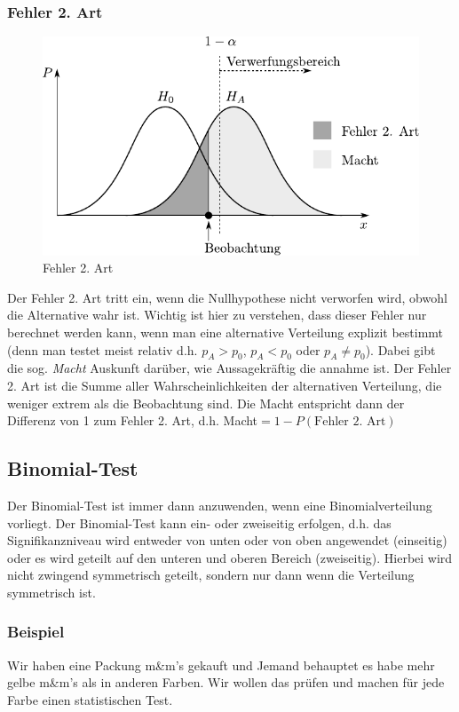 \subsubsection{Fehler 2. Art}
\begin{figure}
        \centering
        \includegraphics[scale=\graphscale]{fehler-zweiter-art.pdf}
        \caption{Fehler 2. Art}
\end{figure}

Der Fehler 2. Art tritt ein, wenn die Nullhypothese nicht verworfen
wird, obwohl die Alternative wahr ist. Wichtig ist hier zu verstehen,
dass dieser Fehler nur berechnet werden kann, wenn man eine alternative
Verteilung explizit bestimmt (denn man testet meist relativ d.h.
$p_A > p_0$, $p_A < p_0$ oder $p_A \neq p_0$).
Dabei gibt die sog. \emph{Macht} Auskunft darüber, wie Aussagekräftig
die annahme ist.
Der Fehler 2. Art ist die Summe aller Wahrscheinlichkeiten der alternativen
Verteilung, die weniger extrem als die Beobachtung sind.
Die Macht entspricht dann der Differenz von 1 zum Fehler 2. Art, 
d.h. Macht$=1-P(\text{Fehler 2. Art})$

\subsection{Binomial-Test}
Der Binomial-Test ist immer dann anzuwenden, wenn eine Binomialverteilung
vorliegt. Der Binomial-Test kann ein- oder zweiseitig erfolgen, d.h. das
Signifikanzniveau wird entweder von unten oder von oben angewendet (einseitig)
oder es wird geteilt auf den unteren und oberen Bereich (zweiseitig). 
Hierbei wird nicht zwingend symmetrisch geteilt, sondern nur dann wenn
die Verteilung symmetrisch ist.

\subsubsection*{Beispiel}
Wir haben eine Packung m\&m's gekauft und Jemand behauptet es habe
mehr gelbe m\&m's als in anderen Farben. Wir wollen das prüfen und
machen für jede Farbe einen statistischen Test.

